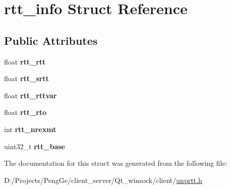 \hypertarget{structrtt__info}{}\section{rtt\+\_\+info Struct Reference}
\label{structrtt__info}
\subsection*{Public Attributes}
\begin{DoxyCompactItemize}
\item 
\hypertarget{structrtt__info_a63cf11310859ddccb8927225f3547b30}{}float {\bfseries rtt\+\_\+rtt}\label{structrtt__info_a63cf11310859ddccb8927225f3547b30}

\item 
\hypertarget{structrtt__info_a10236c8eb80b30f1d37d44ccc449eddb}{}float {\bfseries rtt\+\_\+srtt}\label{structrtt__info_a10236c8eb80b30f1d37d44ccc449eddb}

\item 
\hypertarget{structrtt__info_a606ee3fa94939f59b7bde1623de059c9}{}float {\bfseries rtt\+\_\+rttvar}\label{structrtt__info_a606ee3fa94939f59b7bde1623de059c9}

\item 
\hypertarget{structrtt__info_a4872c2830891ce21535646376c4311cf}{}float {\bfseries rtt\+\_\+rto}\label{structrtt__info_a4872c2830891ce21535646376c4311cf}

\item 
\hypertarget{structrtt__info_a19ec3e43f0bff53ea5a0d39025b7f9ae}{}int {\bfseries rtt\+\_\+nrexmt}\label{structrtt__info_a19ec3e43f0bff53ea5a0d39025b7f9ae}

\item 
\hypertarget{structrtt__info_a552a6d4f8a5c78271145b30e31a72630}{}uint32\+\_\+t {\bfseries rtt\+\_\+base}\label{structrtt__info_a552a6d4f8a5c78271145b30e31a72630}

\end{DoxyCompactItemize}


The documentation for this struct was generated from the following file\+:\begin{DoxyCompactItemize}
\item 
D\+:/\+Projects/\+Peng\+Ge/client\+\_\+server/\+Qt\+\_\+winsock/client/\hyperlink{unprtt_8h}{unprtt.\+h}\end{DoxyCompactItemize}

